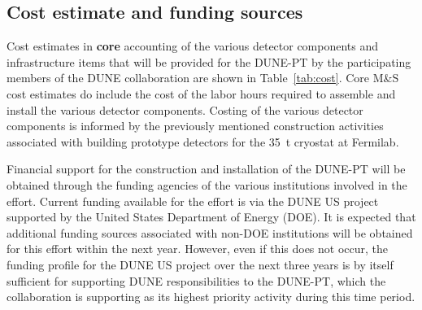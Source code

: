 




%

\subsection{Cost estimate and funding sources}
Cost estimates in {\bf core}  accounting of the various detector components and infrastructure items that 
will be provided for the DUNE-PT by the participating members of the DUNE collaboration are shown in 
Table~\ref{tab:cost}.  Core M\&S cost estimates do include the cost of the labor hours required to 
assemble and install the various detector components.  Costing of the 
various detector components is informed by the previously mentioned construction activities associated 
with building prototype detectors for the 35~t cryostat at Fermilab.

Financial support for the construction and installation of the DUNE-PT will be obtained through the 
funding agencies of the various institutions involved in the effort.  Current funding available for 
the effort is via the DUNE US project supported by the United States Department of Energy (DOE).  It 
is expected that additional funding sources associated with non-DOE institutions will be obtained for 
this effort within the next year.  However, even if this does not occur, the funding profile for the 
DUNE US project over the next three years is by itself sufficient for supporting DUNE responsibilities 
to the DUNE-PT, which the collaboration is supporting as its highest priority activity during this 
time period.      
  

